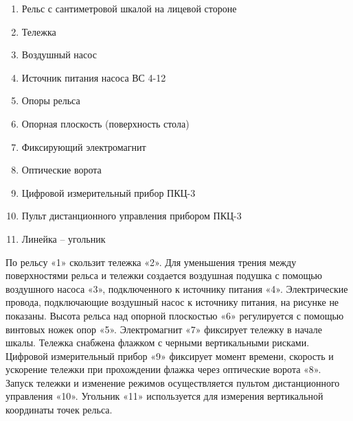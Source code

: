 \documentclass[a4paper]{article}
\begin{document}
\begin{enumerate}
	\item Рельс с сантиметровой шкалой на лицевой стороне
	\item Тележка
	\item Воздушный насос
	\item Источник питания насоса ВС 4-12
	\item Опоры рельса
	\item Опорная плоскость (поверхность стола)
	\item Фиксирующий электромагнит
	\item Оптические ворота
	\item Цифровой измерительный прибор ПКЦ-3
	\item Пульт дистанционного управления прибором ПКЦ-3
	\item Линейка – угольник
\end{enumerate}
По рельсу «1» скользит тележка «2». Для уменьшения трения между поверхностями рельса и тележки создается воздушная подушка с помощью воздушного насоса «3», подключенного к источнику питания «4». Электрические провода, подключающие воздушный насос к источнику питания, на рисунке не показаны. Высота рельса над опорной плоскостью «6» регулируется с помощью винтовых ножек опор «5». Электромагнит «7» фиксирует тележку в начале шкалы. Тележка снабжена флажком с черными вертикальными рисками. Цифровой измерительный прибор «9» фиксирует момент времени, скорость и ускорение тележки при прохождении флажка через оптические ворота «8». Запуск тележки и изменение режимов осуществляется пультом дистанционного управления «10». Угольник «11» используется для измерения вертикальной координаты точек рельса.
\end{document}
